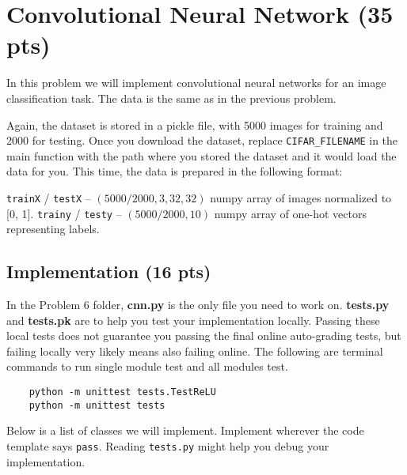 \section{Convolutional Neural Network (35 pts)}

In this problem we will implement convolutional neural networks for an image classification task. The data is the same as in the previous problem. 

Again, the dataset is stored in a pickle file, with 5000 images for training and 2000 for testing. Once you download the dataset, replace \texttt{CIFAR\_FILENAME} in the main function with the path where you stored the dataset and it would load the data for you. This time, the data is prepared in the following format:

\texttt{trainX} / \texttt{testX} -- $(5000/2000, 3, 32, 32)$ numpy array of images normalized to [0, 1].\newline
\texttt{trainy} / \texttt{testy} -- $(5000/2000, 10)$ numpy array of one-hot vectors representing labels.

\subsection{Implementation (16 pts)}

In the Problem 6 folder, \textbf{cnn.py} is the only file you need to work on. \textbf{tests.py} and \textbf{tests.pk} are to help you test your implementation locally. Passing these local tests does not guarantee you passing the final online auto-grading tests, but failing locally very likely means also failing online. The following are terminal commands to run single module test and all modules test. 
\begin{verbatim}
    python -m unittest tests.TestReLU
    python -m unittest tests
\end{verbatim}

Below is a list of classes we will implement. Implement wherever the code template says \texttt{pass}. Reading \texttt{tests.py} might help you debug your implementation. 

